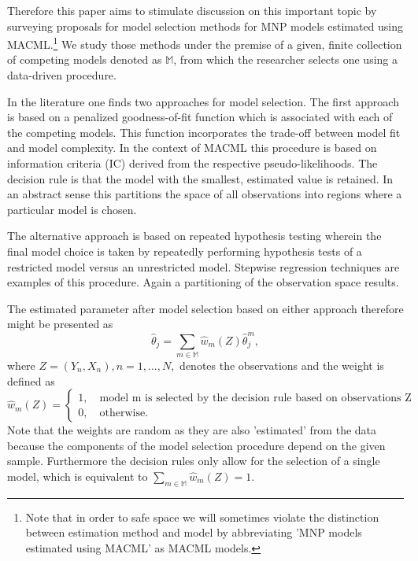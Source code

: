 \documentclass[12pt, a4paper]{article}
\numberwithin{defcounter}{section}
\numberwithin{excounter}{section}
\begin{document}
Therefore this paper aims to stimulate discussion on this important topic by surveying proposals for model selection methods for \ac{MNP} models estimated using \ac{MACML}.\footnote{Note that in order to safe space we will sometimes violate the distinction between estimation method and model by abbreviating '\ac{MNP} models estimated using \ac{MACML}' as \ac{MACML} models.} We study those methods under the premise of a given, finite collection of competing models denoted as $\mathbb{M}$, 
from which the researcher selects one using a data-driven procedure. 

In the literature one finds two approaches for model selection. The first approach is based on a penalized goodness-of-fit function which is associated with each of the competing models. This function incorporates the trade-off between model fit and model complexity. In the context of \ac{MACML} this procedure is based on information criteria (IC) derived from the respective pseudo-likelihoods. 
The decision rule is that the model with the smallest, estimated value is retained. In an abstract sense this
partitions the space of all observations into regions where a particular model is chosen.

The alternative approach is based on repeated hypothesis testing wherein the final model choice is taken by repeatedly performing hypothesis tests of a restricted model versus an unrestricted model. Stepwise regression techniques are examples of this procedure. Again a partitioning of the observation space results. 


The estimated parameter after model selection based on either approach therefore might be presented as 
\begin{equation*}
\hat{\theta}_j = \sum_{m \in \mathbb{M}} \hat{w}_m (Z) \hat{\theta}_j^m,
\end{equation*}
where $Z = (Y_n,X_n), n=1,...,N,$ denotes the observations and the weight is defined as 
\begin{equation*}
\hat{w}_m(Z)  = \begin{cases}
1,\quad \text{model m is selected by the decision rule based on observations Z}\\
0,\quad \text{otherwise}.
\end{cases}
\end{equation*}
Note that the weights are random as they are also 'estimated' from the data because the components of the model selection procedure depend on the given sample. Furthermore the decision rules only allow for the selection of a single model, which is equivalent to $\sum_{m \in \mathbb{M}} \hat{w}_m(Z) = 1$.
\end{document}
